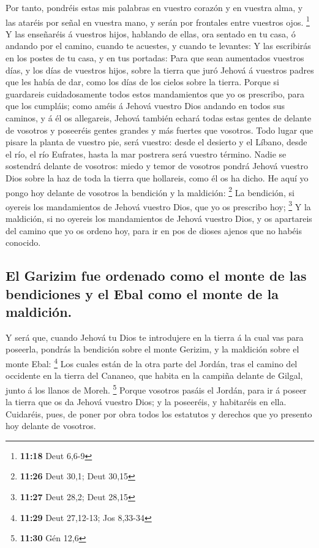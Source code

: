  Por tanto, pondréis estas mis palabras en vuestro
corazón y en vuestra alma, y las ataréis por señal en vuestra mano, y
serán por frontales entre vuestros ojos. \footnote{\textbf{11:18} Deut
  6,6-9}  Y las enseñaréis á vuestros hijos, hablando de
ellas, ora sentado en tu casa, ó andando por el camino, cuando te
acuestes, y cuando te levantes:  Y las escribirás en los
postes de tu casa, y en tus portadas:  Para que sean
aumentados vuestros días, y los días de vuestros hijos, sobre la tierra
que juró Jehová á vuestros padres que les había de dar, como los días de
los cielos sobre la tierra.  Porque si guardareis
cuidadosamente todos estos mandamientos que yo os prescribo, para que
los cumpláis; como améis á Jehová vuestro Dios andando en todos sus
caminos, y á él os allegareis,  Jehová también echará
todas estas gentes de delante de vosotros y poseeréis gentes grandes y
más fuertes que vosotros.  Todo lugar que pisare la
planta de vuestro pie, será vuestro: desde el desierto y el Líbano,
desde el río, el río Eufrates, hasta la mar postrera será vuestro
término.  Nadie se sostendrá delante de vosotros: miedo y
temor de vosotros pondrá Jehová vuestro Dios sobre la haz de toda la
tierra que hollareis, como él os ha dicho.  He aquí yo
pongo hoy delante de vosotros la bendición y la maldición: \footnote{\textbf{11:26}
  Deut 30,1; Deut 30,15}  La bendición, si oyereis los
mandamientos de Jehová vuestro Dios, que yo os prescribo hoy;
\footnote{\textbf{11:27} Deut 28,2; Deut 28,15}  Y la
maldición, si no oyereis los mandamientos de Jehová vuestro Dios, y os
apartareis del camino que yo os ordeno hoy, para ir en pos de dioses
ajenos que no habéis conocido.

\hypertarget{el-garizim-fue-ordenado-como-el-monte-de-las-bendiciones-y-el-ebal-como-el-monte-de-la-maldiciuxf3n.}{%
\subsection{El Garizim fue ordenado como el monte de las bendiciones y
el Ebal como el monte de la
maldición.}\label{el-garizim-fue-ordenado-como-el-monte-de-las-bendiciones-y-el-ebal-como-el-monte-de-la-maldiciuxf3n.}}

 Y será que, cuando Jehová tu Dios te introdujere en la
tierra á la cual vas para poseerla, pondrás la bendición sobre el monte
Gerizim, y la maldición sobre el monte Ebal: \footnote{\textbf{11:29}
  Deut 27,12-13; Jos 8,33-34}  Los cuales están de la
otra parte del Jordán, tras el camino del occidente en la tierra del
Cananeo, que habita en la campiña delante de Gilgal, junto á los llanos
de Moreh. \footnote{\textbf{11:30} Gén 12,6}  Porque
vosotros pasáis el Jordán, para ir á poseer la tierra que os da Jehová
vuestro Dios; y la poseeréis, y habitaréis en ella. 
Cuidaréis, pues, de poner por obra todos los estatutos y derechos que yo
presento hoy delante de vosotros.

